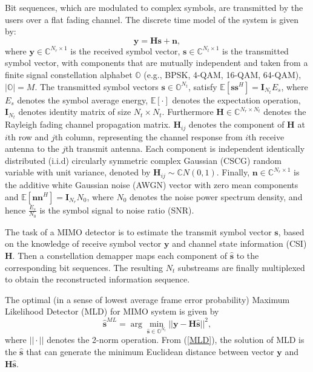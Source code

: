 \documentclass[12pt, draftclsnofoot, onecolumn]{IEEEtran}
\begin{document}
Bit sequences, which are modulated to complex symbols, are transmitted by the users over a flat fading channel. The discrete time model of the system is given by:
\begin{equation}
\mathbf{y}=\mathbf{H}\mathbf{s}+\mathbf{n},   \label{discrete time MIMO system}
\end{equation}
where $\mathbf{y}\in\mathbb{C}^{N_{r}\times 1}$ is the received symbol vector, $\mathbf{s}\in \mathbb{C}^{N_{t}\times 1}$ is the transmitted symbol vector, with components that are mutually independent and taken from a finite signal constellation alphabet $\mathbb{O}$ (e.g., BPSK, 4-QAM, 16-QAM, 64-QAM), $|\mathbb{O}|=M$. The transmitted symbol vectors $\mathbf{s}\in \mathbb{O}^{N_{t}}$, satisfy $\mathbb{E}[\mathbf{s}\mathbf{s}^{H}]=\mathbf{I}_{N_t}E_{s}$, where $E_{s}$ denotes the symbol average energy, $\mathbb{E}[\cdot]$ denotes the expectation operation, $\mathbf{I}_{N_{t}}$ denotes identity matrix of size $N_{t}\times N_{t}$. Furthermore $\mathbf{H}\in \mathbb{C}^{N_{r}\times N_{t}}$ denotes the Rayleigh fading channel propagation matrix. $\mathbf{H}_{ij}$ denotes the component of $\mathbf{H}$ at $i$th row and $j$th column, representing the channel response from $i$th receive antenna to the $j$th transmit antenna. Each component is independent identically distributed (i.i.d) circularly symmetric complex Gaussian (CSCG) random variable with unit variance, denoted by $\mathbf{H}_{ij}\sim \mathbb{C}N(0,1)$. Finally, $\mathbf{n}\in \mathbb{C}^{N_{r}\times 1}$ is the additive white Gaussian noise (AWGN) vector with zero mean components and $\mathbb{E}[\mathbf{n}\mathbf{n}^{H}]=\mathbf{I}_{N_{r}}N_{0}$, where $N_{0}$ denotes the noise power spectrum density, and hence $\frac{E_{s}}{N_{0}}$ is the symbol signal to noise ratio (SNR). 

The task of a MIMO detector is to estimate the transmit symbol vector $\mathbf{s}$, based on the knowledge of receive symbol vector $\mathbf{y}$ and channel state information (CSI) $\mathbf{H}$. Then a constellation demapper maps each component of $\hat{\mathbf{s}}$ to the corresponding bit sequences. The resulting $N_{t}$ substreams are finally multiplexed to obtain the reconstructed information sequence.

The optimal (in a sense of lowest average frame error probability) Maximum Likelihood Detector (MLD) for MIMO system is given by
\begin{equation}
\hat{\mathbf{s}}^{ML}=\arg\min_{\hat{\mathbf{s}}\in \mathbb{O}^{N_{t}}}||\mathbf{y}-\mathbf{H}\hat{\mathbf{s}}||^{2},
\label{MLD}
\end{equation}
where $||\cdot||$ denotes the 2-norm operation. From (\ref{MLD}), the solution of MLD is the $\hat{\mathbf{s}}$ that can generate the minimum Euclidean distance between vector $\mathbf{y}$ and $\mathbf{H}\hat{\mathbf{s}}$.
\end{document}
